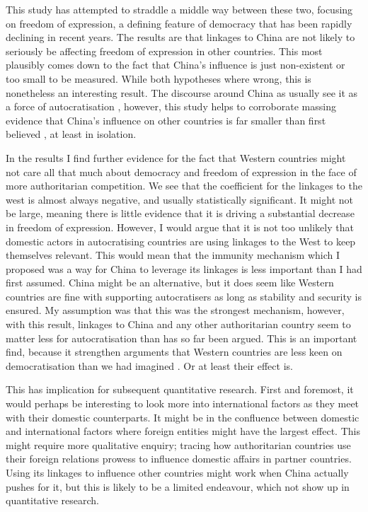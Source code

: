 This study has attempted to straddle a middle way between these two, focusing on freedom of expression, a defining feature of democracy that has been rapidly declining in recent years. The results are that linkages to China are not likely to seriously be affecting freedom of expression in other countries. This most plausibly comes down to the fact that China's influence is just non-existent or too small to be measured. While both hypotheses where wrong, this is nonetheless an interesting result. The discourse around China as usually see it as a force of autocratisation \citep{jintao_chinas_2023, biden_remarks_2021, economy_exporting_2020, repucci_authoritarians_2022}, however, this study helps to corroborate massing evidence that China's influence on other countries is far smaller than first believed \citep{saba_promoting_2025, borzel_noble_2015, risse_democracy_2015, hackenesch_not_2015}, at least in isolation.

In the results I find further evidence for the fact that Western countries might not care all that much about democracy and freedom of expression in the face of more authoritarian competition. We see that the coefficient for the linkages to the west is almost always negative, and usually statistically significant. It might not be large, meaning there is little evidence that it is driving a substantial decrease in freedom of expression. However, I would argue that it is not too unlikely that domestic actors in autocratising countries are using linkages to the West to keep themselves relevant. This would mean that the immunity mechanism which I proposed was a way for China to leverage its linkages is less important than I had first assumed. China might be an alternative, but it does seem like Western countries are fine with supporting autocratisers as long as stability and security is ensured. My assumption was that this was the strongest mechanism, however, with this result, linkages to China and any other authoritarian country seem to matter less for autocratisation than has so far been argued. This is an important find, because it strengthen arguments that Western countries are less keen on democratisation than we had imagined \citep{borzel_noble_2015, delcour_spoiler_2015, freyburg_local_2015, risse_democracy_2015}. Or at least their effect is. 

This has implication for subsequent quantitative research. First and foremost, it would perhaps be interesting to look more into international factors as they meet with their domestic counterparts. It might be in the confluence between domestic and international factors where foreign entities might have the largest effect. This might require more qualitative enquiry; tracing how authoritarian countries use their foreign relations prowess to influence domestic affairs in partner countries. Using its linkages to influence other countries might work when China actually pushes for it, but this is likely to be a limited endeavour, which not show up in quantitative research. 

